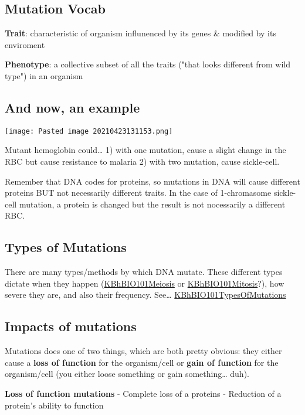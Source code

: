 \documentclass[letterpaper]{article}
\begin{document}
\subsection{Mutation Vocab}
\label{sec:org3820e7b}
\textbf{Trait}: characteristic of organism influnenced by its genes \& modified
by its enviroment

\textbf{Phenotype}: a collective subset of all the traits ("that looks
different from wild type") in an organism

\subsection{And now, an example}
\label{sec:org415f302}
\begin{center}
\texttt{[image: Pasted image 20210423131153.png]}
\end{center}

Mutant hemoglobin could\ldots{} 1) with one mutation, cause a slight change
in the RBC but cause resistance to malaria 2) with two mutation, cause
sickle-cell.

Remember that DNA codes for proteins, so mutations in DNA will cause
different proteins BUT not necessarily different traits. In the case of
1-chromasome sickle-cell mutation, a protein is changed but the result
is not nocessarily a different RBC.

\subsection{Types of Mutations}
\label{sec:orgb8ae474}
There are many types/methods by which DNA mutate. These different types
dictate when they happen
(\href{KBhBIO101Meiosis.org}{KBhBIO101Meiosis} or
\href{KBhBIO101Mitosis.org}{KBhBIO101Mitosis}?), how severe they are,
and also their frequency. See\ldots{}
\href{KBhBIO101TypesOfMutations.org}{KBhBIO101TypesOfMutations}

\subsection{Impacts of mutations}
\label{sec:org41b92dd}
Mutations does one of two things, which are both pretty obvious: they
either cause a \textbf{loss of function} for the organism/cell or \textbf{gain of
function} for the organism/cell (you either loose something or gain
something\ldots{} duh).

\textbf{Loss of function mutations} - Complete loss of a proteins - Reduction
of a protein's ability to function
\end{document}
